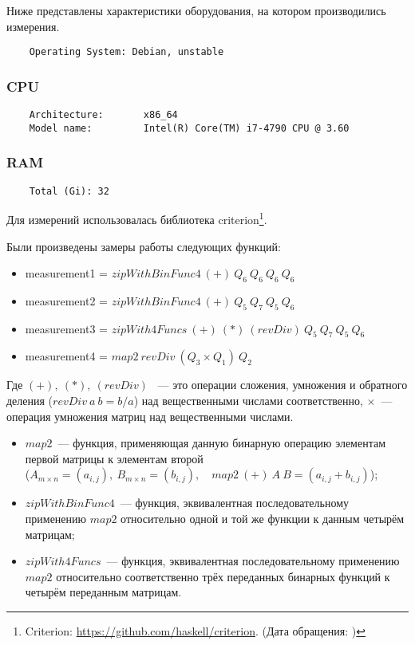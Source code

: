 Ниже представлены характеристики оборудования, на котором производились измерения.
\begin{verbatim}
    Operating System: Debian, unstable
    \end{verbatim}

\subsubsection*{CPU}
\begin{verbatim}
    Architecture:       x86_64
    Model name:         Intel(R) Core(TM) i7-4790 CPU @ 3.60
    \end{verbatim}

\subsubsection*{RAM}
\begin{verbatim}
    Total (Gi): 32
\end{verbatim}
Для измерений использовалась библиотека criterion\footnote{Criterion: \url{https://github.com/haskell/criterion}. (Дата обращения: )}.

Были произведены замеры работы следующих функций:
\begin{itemize}
    \item measurement1 = $zipWithBinFunc4\ (+) \ Q_6 \ Q_6 \ Q_6\ Q_6$
    \item measurement2 = $zipWithBinFunc4\ (+) \ Q_5 \ Q_7 \ Q_5\ Q_6$
    \item measurement3 = $zipWith4Funcs\ (+) \ (*)\ (revDiv) \ Q_5 \ Q_7 \ Q_5\ Q_6$
    \item measurement4 = $map2\ revDiv\ (Q_3 \times Q_1)\ Q_2 $
\end{itemize}
Где $(+),\ (*), \ (revDiv) $ ~--- это операции сложения, умножения и обратного деления ($revDiv \ a \ b = b / a $) над вещественными числами соответственно, $\times$~--- операция умножения матриц над вещественными числами.
\begin{itemize}
    \item $map2$~--- функция, применяющая данную бинарную операцию элементам первой матрицы к элементам второй\\($A_{m\times n} = (a_{i, j}), \ B_{m\times n} = (b_{i, j}), \quad map2 \ (+)\ A \ B = (a_{i, j} + b_{i, j})$);
    \item $zipWithBinFunc4$~--- функция, эквивалентная последовательному применению $map2$ относительно одной и той же функции к данным четырём матрицам;
    \item $zipWith4Funcs$~--- функция, эквивалентная последовательному применению $map2$ относительно соответственно трёх переданных бинарных функций к четырём переданным матрицам.
\end{itemize}
